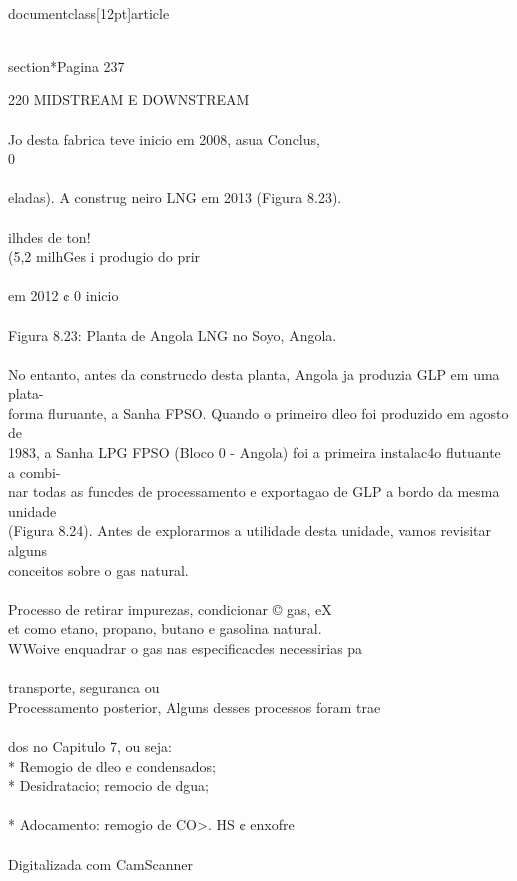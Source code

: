 \\documentclass[12pt]{article}
\begin{document}
\\section*{Pagina 237}

220 MIDSTREAM E DOWNSTREAM\\
\\
Jo desta fabrica teve inicio em 2008, asua Conclus,\\
0\\
\\
eladas). A construg neiro LNG em 2013 (Figura 8.23).\\
\\
ilhdes de ton!\\
(5,2 milhGes i produgio do prir\\
\\
em 2012 ¢ 0 inicio\\
\\
Figura 8.23: Planta de Angola LNG no Soyo, Angola.\\
\\
No entanto, antes da construcdo desta planta, Angola ja produzia GLP em uma plata-\\
forma fluruante, a Sanha FPSO. Quando o primeiro dleo foi produzido em agosto de\\
1983, a Sanha LPG FPSO (Bloco 0 - Angola) foi a primeira instalac4o flutuante a combi-\\
nar todas as funcdes de processamento e exportagao de GLP a bordo da mesma unidade\\
(Figura 8.24). Antes de explorarmos a utilidade desta unidade, vamos revisitar alguns\\
conceitos sobre o gas natural.\\
\\
Processo de retirar impurezas, condicionar © gas, eX\\
et como etano, propano, butano e gasolina natural.\\
WWoive enquadrar o gas nas especificacdes necessirias pa\\
\\
transporte, seguranca ou\\
Processamento posterior, Alguns desses processos foram trae\\
\\
dos no Capitulo 7, ou seja:\\
* Remogio de dleo e condensados;\\
* Desidratacio; remocio de dgua;\\
\\
* Adocamento: remogio de CO>. HS ¢ enxofre\\
\\
Digitalizada com CamScanner\\
\end{document}
